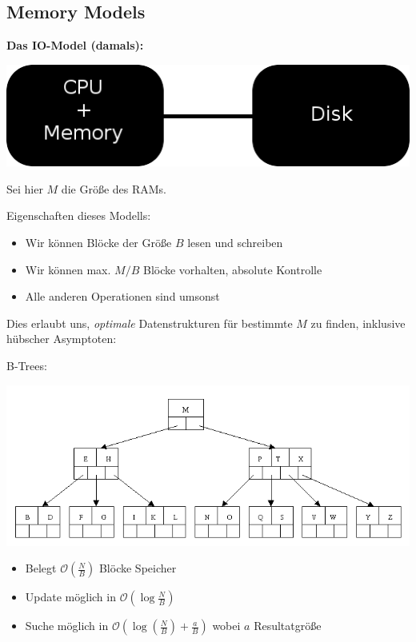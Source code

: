 \documentclass{beamer}
\begin{document}
\subsection{Memory Models}

\begin{frame}
\textbf{Das IO-Model (damals):}

\begin{center}
\includegraphics[scale=0.375]{model1.png} 
\end{center}
Sei hier $M$ die Größe des RAMs.\smallskip\smallskip
\pause

Eigenschaften dieses Modells:
\begin{itemize}
\item Wir können Blöcke der Größe $B$ lesen und schreiben\pause
\item Wir können max. $M/B$ Blöcke vorhalten, absolute Kontrolle\pause
\item Alle anderen Operationen sind \glqq umsonst\grqq
\end{itemize}
\end{frame}


\begin{frame}
Dies erlaubt uns, \emph{optimale} Datenstrukturen für bestimmte $M$ zu finden, inklusive
hübscher Asymptoten:\pause\bigskip

B-Trees:
\begin{center}
\includegraphics[scale=0.35]{btree1.png}
\end{center}
\pause

\begin{itemize}
\item Belegt $\mathcal{O}(\frac{N}{B})$ Blöcke Speicher
\item Update möglich in $\mathcal{O}(\log{}\frac{N}{B})$
\item Suche möglich in $\mathcal{O}(\log{\left(\frac{N}{B}\right)} + \frac{a}{B})$ wobei $a$ Resultatgröße
\end{itemize}
\end{frame}
\end{document}
